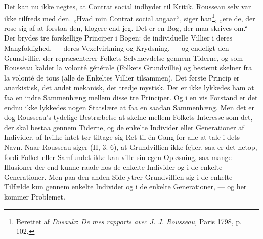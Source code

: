 \documentclass[12pt,a4paper,openany]{book}
\newcommand{\opage}[1]{\marginnote{\footnotesize\textit{[#1]}}}
\begin{document}
Det kan nu ikke negtes, at Contrat social indbyder til
Kritik. Rousseau selv var ikke tilfreds med den. „Hvad min
Contrat social angaar“, siger han\footnote[3]{Berettet af \emph{Dusaulx}: \textit{De mes rapports avec J. J. Rousseau,} Paris 1798, p. 102.}, „ere de, der rose sig af at
forstaa den, klogere end jeg. Det er en Bog, der maa skrives
\setcounter{footnote}{0}%
\opage{140}om.“ --- Der brydes tre forskellige Principer i Bogen: de individuelle
Villier i deres Mangfoldighed, --- deres Vexelvirkning og
Krydsning, --- og endeligt den Grundvillie, der repræsenterer Folkets
Selvhævdelse gennem Tiderne, og som Rousseau kalder
la volonté générale (Folkets Grundvillie) og bestemt skelner fra
la volonté de tous (alle de Enkeltes Villier tilsammen). Det
første Princip er anarkistisk, det andet mekanisk, det tredje
mystisk. Det er ikke lykkedes ham at faa en indre Sammenhæng
mellem disse tre Principer. Og i en vis Forstand er det
endnu ikke lykkedes nogen Statslære at faa en saadan Sammenhæng.
Men det er dog Rousseau’s tydelige Bestræbelse at
skelne mellem Folkets Interesse som det, der skal bestaa gennem
Tiderne, og de enkelte Individer eller Generationer af Individer,
af hvilke intet tør tiltage sig Ret til én Gang for alle
at tale i dets Navn. Naar Rousseau siger (II, 3. 6), at Grundvillien
ikke fejler, saa er det netop, fordi Folket eller Samfundet
ikke kan ville sin egen Opløsning, saa mange Illusioner
der end kunne raade hos de enkelte Individer og i de enkelte
Generationer. Men paa den anden Side ytrer Grundvillien sig
i de enkelte Tilfælde kun gennem enkelte Individer og i de
enkelte Generationer, --- og her kommer Problemet.
\end{document}
